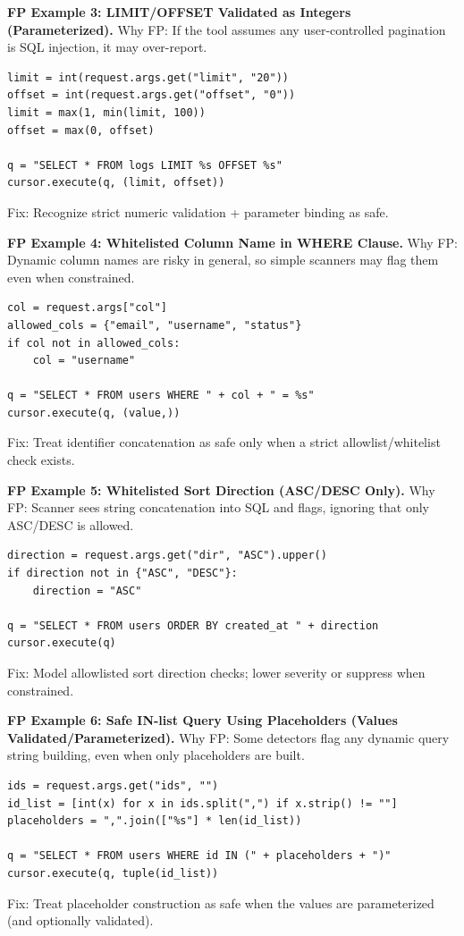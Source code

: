\textbf{FP Example 3: LIMIT/OFFSET Validated as Integers (Parameterized).} Why FP: If the tool assumes any user-controlled pagination is SQL injection, it may over-report.

\begin{lstlisting}[style=pycode]
limit = int(request.args.get("limit", "20"))
offset = int(request.args.get("offset", "0"))
limit = max(1, min(limit, 100))
offset = max(0, offset)

q = "SELECT * FROM logs LIMIT %s OFFSET %s"
cursor.execute(q, (limit, offset))
\end{lstlisting}
Fix: Recognize strict numeric validation + parameter binding as safe.

\textbf{FP Example 4: Whitelisted Column Name in WHERE Clause.} Why FP: Dynamic column names are risky in general, so simple scanners may flag them even when constrained.

\begin{lstlisting}[style=pycode]
col = request.args["col"]
allowed_cols = {"email", "username", "status"}
if col not in allowed_cols:
    col = "username"

q = "SELECT * FROM users WHERE " + col + " = %s"
cursor.execute(q, (value,))
\end{lstlisting}
Fix: Treat identifier concatenation as safe only when a strict allowlist/whitelist check exists.

\textbf{FP Example 5: Whitelisted Sort Direction (ASC/DESC Only).} Why FP: Scanner sees string concatenation into SQL and flags, ignoring that only ASC/DESC is allowed.

\begin{lstlisting}[style=pycode]
direction = request.args.get("dir", "ASC").upper()
if direction not in {"ASC", "DESC"}:
    direction = "ASC"

q = "SELECT * FROM users ORDER BY created_at " + direction
cursor.execute(q)
\end{lstlisting}
Fix: Model allowlisted sort direction checks; lower severity or suppress when constrained.

\textbf{FP Example 6: Safe IN-list Query Using Placeholders (Values Validated/Parameterized).} Why FP: Some detectors flag any dynamic query string building, even when only placeholders are built.

\begin{lstlisting}[style=pycode]
ids = request.args.get("ids", "")
id_list = [int(x) for x in ids.split(",") if x.strip() != ""]
placeholders = ",".join(["%s"] * len(id_list))

q = "SELECT * FROM users WHERE id IN (" + placeholders + ")"
cursor.execute(q, tuple(id_list))
\end{lstlisting}
Fix: Treat placeholder construction as safe when the values are parameterized (and optionally validated).


